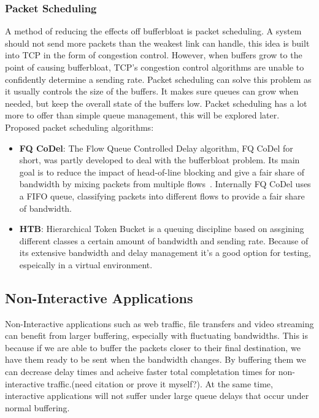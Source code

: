 \documentclass[a4paper,english, 11pt]{report}
\begin{document}
\subsubsection{Packet Scheduling}
A method of reducing the effects off bufferbloat is packet scheduling. A system should not send more packets than the weakest link can handle, this idea is built into TCP in the form of congestion control. However, when buffers grow to the point of causing bufferbloat, TCP's congestion control algorithms are unable to confidently determine a sending rate. Packet scheduling can solve this problem as it usually controls the size of the buffers. It makes sure queues can grow when needed, but keep the overall state of the buffers low. Packet scheduling has a lot more to offer than simple queue management, this will be explored later.\\

Proposed packet scheduling algorithms:
\begin{itemize}
  \item \textbf{FQ CoDel}: The Flow Queue Controlled Delay algorithm, FQ CoDel for short, was partly developed to deal with the bufferbloat problem. Its main goal is to reduce the impact of head-of-line blocking and give a fair share of bandwidth by mixing packets from multiple flows~\cite{fq_codel_rfc}. Internally FQ CoDel uses a FIFO queue, classifying packets into different flows to provide a fair share of bandwidth.
  \item \textbf{HTB}: Hierarchical Token Bucket is a queuing discipline based on assgining different classes a certain amount of bandwidth and sending rate. Because of its extensive bandwidth and delay management it's a good option for testing, espeically in a virtual environment.
\end{itemize}

\subsection{Non-Interactive Applications}
Non-Interactive applications such as web traffic, file transfers and video streaming can benefit from larger buffering, especially with fluctuating bandwidths. This is because if we are able to buffer the packets closer to their final destination, we have them ready to be sent when the bandwidth changes. By buffering them we can decrease delay times and acheive faster total completation times for non-interactive traffic.(need citation or prove it myself?). At the same time, interactive applications will not suffer under large queue delays that occur under normal buffering.
\end{document}
